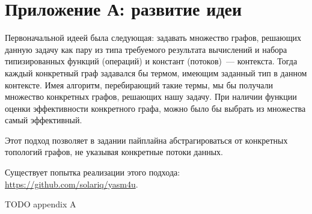 \section*{Приложение А: развитие идеи}

Первоначальной идеей была следующая: задавать множество графов, решающих данную задачу как пару из типа требуемого результата вычислений и набора типизированных функций (операций) и констант (потоков)~--- контекста.
Тогда каждый конкретный граф задавался бы термом, имеющим заданный тип в данном контексте.
Имея алгоритм, перебирающий такие термы, мы бы получали множество конкретных графов, решающих нашу задачу.
При наличии функции оценки эффективности конкретного графа, можно было бы выбрать из множества самый эффективный.

Этот подход позволяет в задании пайплайна абстрагироваться от конкретных топологий графов, не указывая конкретные потоки данных.

Существует попытка реализации этого подхода: \url{https://github.com/solariq/yasm4u}.

TODO appendix A
